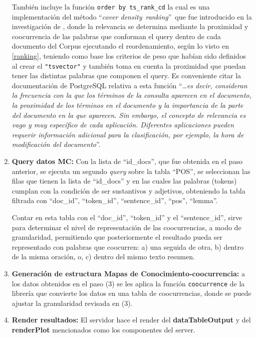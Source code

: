 \documentclass[
  12pt,
  openany]{book}
\begin{document}
\begin{enumerate}
  También incluye la función \texttt{order\ by\ ts\_rank\_cd} la cual es una implementación del método ``\emph{cover density}~\emph{ranking}''~que fue introducido en la investigación de \citep{clarke2000}, donde la relevancia se determina mediante la proximidad y coocurrencia de las palabras que conforman el query dentro de cada documento del Corpus ejecutando el reordenamiento, según lo visto en \ref{ranking}, teniendo como base los criterios de peso que habían sido definidos al crear el \texttt{"tsvector"} y también toma en cuenta la proximidad que puedan tener las distintas palabras que componen el query. Es conveniente citar la documentación de PostgreSQL relativa a esta función ``\ldots{}\emph{es decir, consideran la frecuencia con la que los términos de la consulta aparecen en el documento, la proximidad de los términos en el documento y la importancia de la parte del documento en la que aparecen. Sin embargo, el concepto de relevancia es vago y muy específico de cada aplicación. Diferentes aplicaciones pueden requerir información adicional para la clasificación, por ejemplo, la hora de modificación del documento}''.\\
\item
  \textbf{Query datos MC:} Con la lista de ``id\_docs'', que fue obtenida en el paso anterior, se ejecuta un segundo \emph{query} sobre la tabla ``POS'', se seleccionan las filas que tienen la lista de ``id\_docs'' y en las cuales las palabras (tokens) cumplan con la condición de ser sustantivos y adjetivos, obteniendo la tabla filtrada con ``doc\_id'', ``token\_id'', ``sentence\_id'', ``pos'', ``lemma''.

  Contar en esta tabla con el ``doc\_id'', ``token\_id'' y el ``sentence\_id'', sirve para determinar el nivel de representación de las coocurrencias, a modo de granularidad, permitiendo que posteriormente el resultado pueda ser representado con palabras que coocurren: a) una seguida de otra, b) dentro de la misma oración, o, c) dentro del mismo texto resumen.
\item
  \textbf{Generación de estructura Mapas de Conocimiento-coocurrencia:} a los datos obtenidos en el paso (3) se les aplica la función \texttt{coocurrence} de la librería \citep{udpipe} que convierte los datos en una tabla de coocurrencias, donde se puede ajustar la granularidad revisada en (3).
\item
  \textbf{Render resultados:} El servidor hace el render del \textbf{dataTableOutput} y del \textbf{renderPlot} mencionados como los componentes del server.
\end{enumerate}
\end{document}
